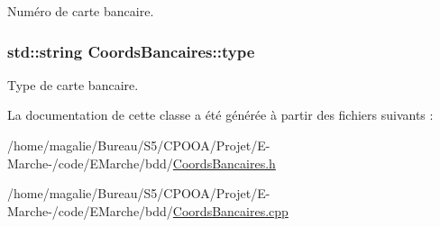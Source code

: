 Numéro de carte bancaire. 

\hypertarget{class_coords_bancaires_ad34142224a2753ad54dddf8d537564b1}{
\subsubsection[{type}]{\setlength{\rightskip}{0pt plus 5cm}std\-::string Coords\-Bancaires\-::type\hspace{0.3cm}{\ttfamily [protected]}}}\label{class_coords_bancaires_ad34142224a2753ad54dddf8d537564b1}


Type de carte bancaire. 



La documentation de cette classe a été générée à partir des fichiers suivants \-:\begin{DoxyCompactItemize}
\item 
/home/magalie/\-Bureau/\-S5/\-C\-P\-O\-O\-A/\-Projet/\-E-\/\-Marche-\//code/\-E\-Marche/bdd/\hyperlink{_coords_bancaires_8h}{Coords\-Bancaires.\-h}\item 
/home/magalie/\-Bureau/\-S5/\-C\-P\-O\-O\-A/\-Projet/\-E-\/\-Marche-\//code/\-E\-Marche/bdd/\hyperlink{_coords_bancaires_8cpp}{Coords\-Bancaires.\-cpp}\end{DoxyCompactItemize}
